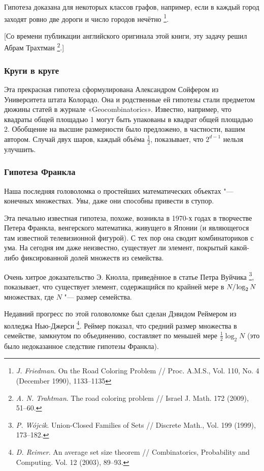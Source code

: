 \documentclass[twoside]{book}
\begin{document}
Гипотеза доказана для некоторых классов графов, например, если в каждый город заходят ровно две дороги и число городов нечётно%
\footnote{\emph{J. Friedman}. On the Road Coloring Problem /\!/ {Proc. A.M.S.}, Vol. 110, No. 4 (December 1990), 1133--1135}.

[Со времени публикации английского оригинала этой книги, эту задачу решил Абрам Трахтман%
\footnote{\emph{A. N. Trahtman}. The road coloring problem /\!/ {Israel J. Math.} 172 (2009), 51--60.}.]


\subsubsection*{Круги в круге}

Эта прекрасная гипотеза сформулирована Александром Сойфером из Университета штата Колорадо.
Она и родственные ей гипотезы стали предметом дюжины статей в журнале «Geo\-com\-bi\-na\-tor\-ics».
Известно, например, что квадраты общей площадью 1 могут быть упакованы в квадрат общей площадью 2.
Обобщение на высшие размерности было предложено, в частности, вашим автором.
Случай двух шаров, каждый объёма $\tfrac12$, показывает, что $2^{d-1}$ нельзя улучшить.

\subsubsection*{Гипотеза Франкла}

Наша последняя головоломка о простейших математических объектах "--- конечных множествах.
Увы, даже они способны привести в ступор.

Эта печально известная гипотеза, похоже, возникла в 1970-х годах в творчестве Петера Франкла, венгерского математика, живущего в Японии (и являющегося там известной телевизионной фигурой).
С тех пор она сводит комбинаториков с ума. 
На сегодня им даже неизвестно, существует ли элемент, покрытый какой-либо фиксированной долей множеств из семейства.

Очень хитрое доказательство Э. Кнолла, приведённое в статье Петра Вуйчика%
\footnote{\emph{P. W\'{o}jcik}. Union-Closed Families of Sets /\!/ {Discrete Math.}, Vol. 199 (1999), 173--182.},
показывает, что существует элемент, содержащийся по крайней мере в $N/\mkern-2mu\log_2 N$ множествах, где $N$ "--- размер семейства.

Недавний прогресс по этой головоломке был сделан Дэвидом Реймером из колледжа Нью-Джерси%
\footnote{\emph{D. Reimer}. An average set size theorem /\!/ {Combinatorics, Probability and Computing.} Vol. 12 (2003), 89--93.}.
Реймер показал, что средний размер множества в семействе, замкнутом по объединению, составляет по меньшей мере $\tfrac12\log_2N$ (это было недоказанное следствие гипотезы Франкла).
\end{document}
